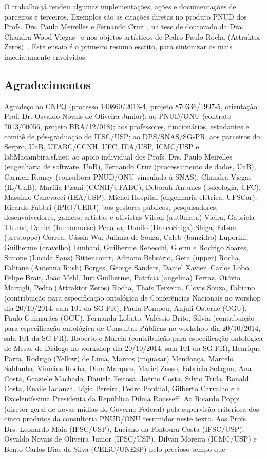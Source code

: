 \documentclass[a4paper, 11pt]{article} %
\begin{document}
O trabalho já rendeu algumas implementações, ações e documentações de parceiros e terceiros. Exemplos são as citações diretas no produto PNUD dos Profs. Drs. Paulo Meirelles e Fernando Cruz~\cite{paulo6}, na tese de doutorado da Dra. Chandra Wood Viegas~\cite{chandra} e nos objetos artísticos de Pedro Paulo Rocha (Attraktor Zeros)~\cite{pedro}. Este ensaio é o primeiro resumo escrito, para sintonizar os mais imediatamente envolvidos.

\subsection*{Agradecimentos}
Agradeço ao CNPQ (processo 140860/2013-4, projeto 870336/1997-5, orientação: Prof. Dr. Osvaldo Novais de Oliveira Junior); ao PNUD/ONU (contrato 2013/00056, projeto BRA/12/018); aos professores, funcionários, estudantes e comitê de pós-graduação do IFSC/USP; ao DPS/SNAS/SG-PR; aos parceiros do Serpro, UnB, UFABC/CCNH, UFC, IEA/USP, ICMC/USP e labMacambira.sf.net; ao apoio individual dos Profs. Drs. Paulo Meirelles (engenharia de software, UnB), Fernando Cruz (processamento de dados, UnB), Carmen Romcy (consultora PNUD/ONU vinculada à SNAS), Chandra Viegas (IL/UnB), Marília Pisani (CCNH/UFABC), Deborah Antunes (psicologia, UFC), Massimo Canevacci (IEA/USP), Michel Hospital (engenharia elétrica, UFSCar), Ricardo Fabbri (IPRJ/UERJ); aos gestores públicos, pesquisadores, desenvolvedores, gamers, artistas e ativistas Vilson (aut0mata) Vieira, Gabriela Thumé, Daniel (humannoise) Penalva, Danilo (DaneoShiga) Shiga, Edson (prestoppc) Correa, Cássia Wu, Juliana de Souza, Caleb (banzidro) Luporini, Guilherme (cravelho) Lunhani, Guilherme Rebecchi, Glerm e Rodrigo Soares, Simone (Lucida Sans) Bittencourt, Adriano Belisário, Gera (upper) Rocha, Fabiane (Antenna Rush) Borges, George Sanders, Daniel Xavier, Carlos Lobo, Felipe Brait, João Mehl, Iuri Guilherme, Patrícia (angelina) Ferraz, Otávio Martigli, Pedro (Attraktor Zeros) Rocha, Thaís Teixeira, Clovis Souza, Fabiano (contribuição para especificação ontológica de Conferências Nacionais no worshop dia 20/10/2014, sala 101 da SG-PR), Paula Pompeu, Anjuli Osterne (OGU), Paulo Guimarães (OGU), Fernanda Lobato, Valéssio Brito, Silvia (contribuição para especificação ontológica de Consultas Públicas no workshop dia 20/10/2014, sala 101 da SG-PR), Roberto e Márcia (contribuição para especificação ontológica de Mesas de Diálogo no workshop dia 20/10/2014, sala 101 da SG-PR), Henrique Parra, Rodrigo (Yellow) de Luna, Marcos (mquasar) Mendonça, Marcelo Saldanha, Vinícius Rocha, Dina Marques, Mariel Zasso, Fabrício Solagna, Ana Costa, Graziele Machado, Daniela Feitosa, Joênio Costa, Silvio Trida, Ronald Costa, Enaile Iadanza, Lígia Pereira, Pedro Pontual, Gilberto Carvalho e a Excelentíssima Presidenta da República Dilma Rousseff. Ao Ricardo Poppi (diretor geral de novas mídias do Governo Federal) pela supervisão criteriosa dos cinco produtos da consultoria PNUD/ONU resumidos neste texto. Aos Profs. Drs. Leonardo Maia (IFSC/USP), Luciano da Fontoura Costa (IFSC/USP), Osvaldo Novais de Oliveira Junior (IFSC/USP), Dilvan Moreira (ICMC/USP) e Bento Carlos Dias da Silva (CELiC/UNESP) pelo precioso tempo que 
\end{document}

